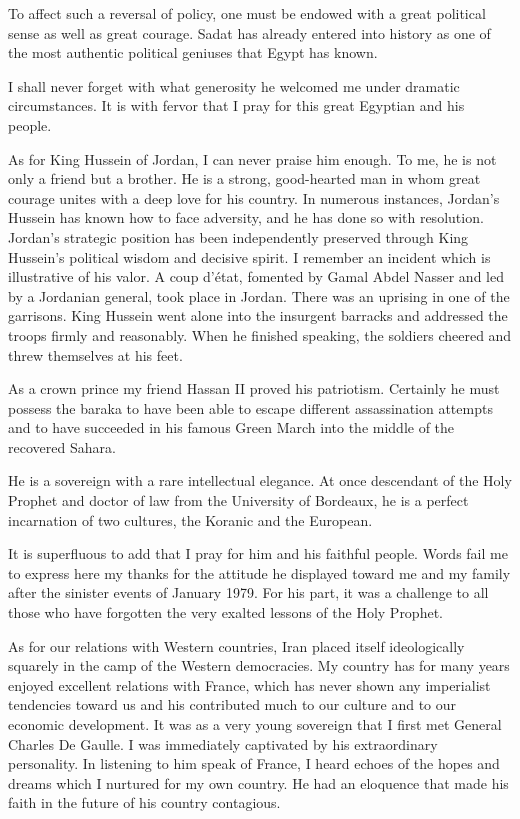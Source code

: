To affect such a reversal of policy, one must be endowed with a great political sense as well as great courage. Sadat has already entered into history as one of the most authentic political geniuses that Egypt has known. 

I shall never forget with what generosity he welcomed me under dramatic circumstances. It is with fervor that I pray for this great Egyptian and his people.

As for King Hussein of Jordan, I can never praise him enough. To me, he is not only a friend but a brother. He is a strong, good-hearted man in whom great courage unites with a deep love for his country. In numerous instances, Jordan's Hussein has known how to face adversity, and he has done so with resolution. Jordan's strategic position has been independently preserved through King Hussein's political wisdom and decisive spirit. I remember an incident which is illustrative of his valor. A coup d'état, fomented by Gamal Abdel Nasser and led by a Jordanian general, took place in Jordan. There was an uprising in one of the garrisons. King Hussein went alone into the insurgent barracks and addressed the troops firmly and reasonably. When he finished speaking, the soldiers cheered and threw themselves at his feet. 

As a crown prince my friend Hassan II proved his patriotism. Certainly he must possess the baraka to have been able to escape different assassination attempts and to have succeeded in his famous Green March into the middle of the recovered Sahara. 

He is a sovereign with a rare intellectual elegance. At once descendant of the Holy Prophet and doctor of law from the University of Bordeaux, he is a perfect incarnation of two cultures, the Koranic and the European. 

It is superfluous to add that I pray for him and his faithful people. Words fail me to express here my thanks for the attitude he displayed toward me and my family after the sinister events of January 1979. For his part, it was a challenge to all those who have forgotten the very exalted lessons of the Holy Prophet. 


As for our relations with Western countries, Iran placed itself ideologically squarely in the camp of the Western democracies. My country has for many years enjoyed excellent relations with France, which has never shown any imperialist tendencies toward us and his contributed much to our culture and to our economic development. It was as a very young sovereign that I first met General Charles De Gaulle. I was immediately captivated by his extraordinary personality. In listening to him speak of France, I heard echoes of the hopes and dreams which I nurtured for my own country. He had an eloquence that made his faith in the future of his country contagious. 


